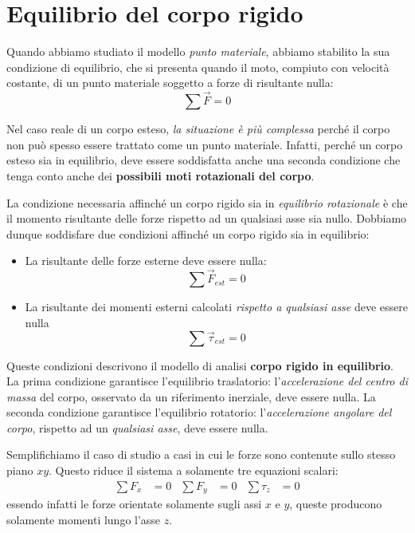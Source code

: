 \documentclass[a4paper,11pt,oneside]{book}
\begin{document}
\chapter{Equilibrio del corpo rigido}
Quando abbiamo studiato il modello \emph{punto materiale}, abbiamo stabilito la sua condizione di equilibrio, che
si presenta quando il moto, compiuto con velocità costante, di un punto materiale soggetto a forze di risultante nulla:
\begin{equation*}
    \sum \vec{F} = 0
\end{equation*}

Nel caso reale di un corpo esteso, \emph{la situazione è più complessa} perché il corpo non può spesso essere trattato come un punto materiale. 
Infatti, perché un corpo esteso sia in equilibrio, deve essere soddisfatta anche una seconda condizione che tenga conto anche dei 
\textbf{possibili moti rotazionali del corpo}.

La condizione necessaria affinché un corpo rigido sia in \emph{equilibrio rotazionale} è che il momento risultante delle forze rispetto ad un qualsiasi asse sia nullo. 
Dobbiamo dunque soddisfare due condizioni affinché un corpo rigido sia in equilibrio:
\begin{itemize}
    \item La risultante delle forze esterne deve essere nulla:
    \begin{equation*}
        \sum \vec{F}_{est} = 0    
    \end{equation*}
    \item La risultante dei momenti esterni calcolati \emph{rispetto a qualsiasi asse} deve essere nulla
    \begin{equation*}
        \sum \vec{\tau}_{est} = 0
    \end{equation*}
\end{itemize}
Queste condizioni descrivono il modello di analisi \textbf{corpo rigido in equilibrio}. 
La prima condizione garantisce l’equilibrio traslatorio: l’\emph{accelerazione del centro di massa} del corpo, osservato da un riferimento inerziale, 
deve essere nulla. La seconda condizione garantisce l’equilibrio rotatorio: l’\emph{accelerazione angolare del corpo}, rispetto ad un \emph{qualsiasi asse}, 
deve essere nulla.

Semplifichiamo il caso di studio a casi in cui le forze sono contenute sullo stesso piano $xy$. Questo riduce il sistema a solamente tre equazioni scalari:
\begin{align*}
    \sum F_x &= 0 & \sum F_y &= 0 & \sum \tau_z &= 0
\end{align*}
essendo infatti le forze orientate solamente sugli assi $x$ e $y$, queste producono solamente momenti lungo l'asse $z$.
\end{document}
